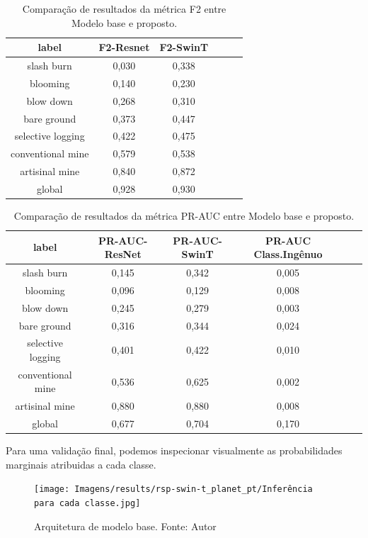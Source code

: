 \begin{table}[h!]
    \caption{ Comparação de resultados da métrica F2 entre Modelo base e proposto.}
    \centering
\begin{tabular}{*{6}{c}}
    \toprule
    label &F2-Resnet&F2-SwinT \\
    \midrule
            slash burn &  0,030 &  0,338 \\ 
              blooming &  0,140 &  0,230 \\
             blow down &  0,268 &  0,310 \\
           bare ground &  0,373 &  0,447 \\
     selective logging &  0,422 &  0,475 \\
     conventional mine &  0,579 &  0,538 \\
        artisinal mine &  0,840 &  0,872 \\
                global &  0,928 &  0,930 \\
    \bottomrule
\end{tabular}
\label{table:ResultadosSwinT}
\end{table}



\begin{table}[h!]
    \caption{ Comparação de resultados da métrica PR-AUC entre Modelo base e proposto.}
    \centering
\begin{tabular}{*{6}{c}}
    \toprule
    label &PR-AUC-ResNet&PR-AUC-SwinT&PR-AUC Class.Ingênuo \\
    \midrule
            slash burn &       0,145 &      0,342 &     0,005 \\
              blooming &       0,096 &      0,129 &     0,008 \\
             blow down &       0,245 &      0,279 &     0,003 \\
           bare ground &       0,316 &      0,344 &     0,024 \\
     selective logging &       0,401 &      0,422 &     0,010 \\
     conventional mine &       0,536 &      0,625 &     0,002 \\
        artisinal mine &       0,880 &      0,880 &     0,008 \\
                global &       0,677 &      0,704 &     0,170 \\
    \bottomrule
\end{tabular}
\label{table:ResultadosSwinT}
\end{table}

Para uma validação final, podemos inspecionar visualmente as probabilidades marginais atribuidas a cada classe.

\begin{figure}[!ht]
    \centering
    \texttt{[image: Imagens/results/rsp-swin-t\_planet\_pt/Inferência para cada classe.jpg]}
    \caption{ Arquitetura de modelo base.
    Fonte: Autor}
    \label{fig:InferenciaClassesSwin}
\end{figure}  
